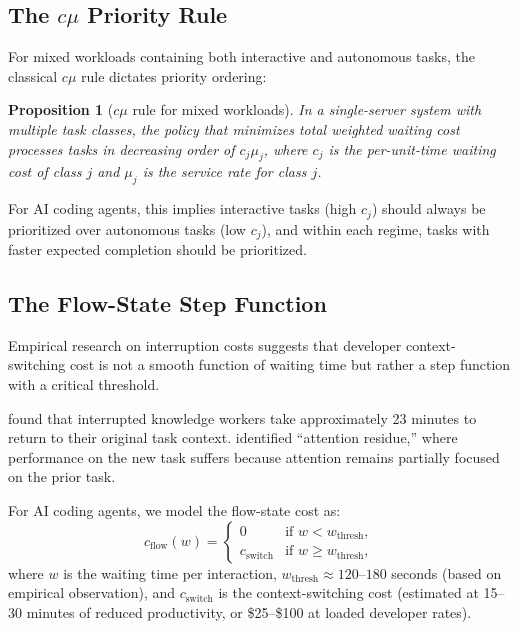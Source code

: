 \documentclass[11pt, a4paper, logo, copyright]{googledeepmind}
\newtheorem{proposition}{Proposition}[section]
\begin{document}
\subsection{The $c\mu$ Priority Rule}

For mixed workloads containing both interactive and autonomous tasks, the classical $c\mu$ rule \citep{vanmieghem1995} dictates priority ordering:

\begin{proposition}[$c\mu$ rule for mixed workloads]\label{prop:cmu}
In a single-server system with multiple task classes, the policy that minimizes total weighted waiting cost processes tasks in decreasing order of $c_j \mu_j$, where $c_j$ is the per-unit-time waiting cost of class $j$ and $\mu_j$ is the service rate for class $j$.
\end{proposition}

For AI coding agents, this implies interactive tasks (high $c_j$) should always be prioritized over autonomous tasks (low $c_j$), and within each regime, tasks with faster expected completion should be prioritized.

\subsection{The Flow-State Step Function}

Empirical research on interruption costs suggests that developer context-switching cost is not a smooth function of waiting time but rather a step function with a critical threshold.

\citet{mark2008interrupted} found that interrupted knowledge workers take approximately 23 minutes to return to their original task context. \citet{leroy2009} identified ``attention residue,'' where performance on the new task suffers because attention remains partially focused on the prior task.

For AI coding agents, we model the flow-state cost as:
\begin{equation}\label{eq:flow-state}
    c_{\text{flow}}(w) = \begin{cases}
        0 & \text{if } w < w_{\text{thresh}}, \\
        c_{\text{switch}} & \text{if } w \geq w_{\text{thresh}},
    \end{cases}
\end{equation}
where $w$ is the waiting time per interaction, $w_{\text{thresh}} \approx 120$--$180$ seconds (based on empirical observation), and $c_{\text{switch}}$ is the context-switching cost (estimated at 15--30 minutes of reduced productivity, or \$25--\$100 at loaded developer rates).
\end{document}

